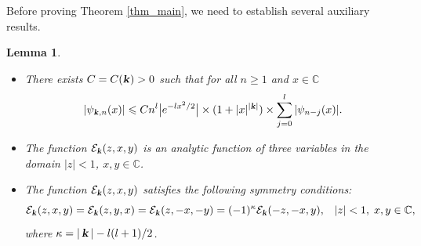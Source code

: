 \documentclass[12pt]{article}
\def\E{{\mathcal E}}
\def\c{{\mathbb C}}
\def\k{\textbf{\textsl{k}}}
\newtheorem{lemma}{Lemma}
\begin{document}
 
Before proving Theorem \ref{thm_main}, we need to establish several auxiliary results.  


\begin{lemma}\label{lemma1}
${}$
\begin{itemize}
\item[(i)]
There exists $C=C(\k)>0$ such that for all $n\geqslant 1$ and $x\in \c$
\begin{equation}\label{psi_upper_bound}
|\psi_{\k,n}(x)|\leqslant C n^l \big | e^{-l x^2/2}\big | \times (1+|x|^{|\k|}) \times \sum\limits_{j=0}^l 
|\psi_{n-j}(x)|.
\end{equation}
\item[(ii)]
 The function $\E_{\k}(z,x,y)$ 
is an analytic function of three variables in the domain $|z|<1$, $x,y\in \c$. 
\item[(iii)] The function $\E_{\k}(z,x,y)$  satisfies the following symmetry conditions:
\begin{equation}\label{E_k_symmetries}
\E_{\k}(z,x,y)=\E_{\k}(z,y,x)=\E_{\k}(z,-x,-y)=(-1)^{\kappa} \E_{\k}(-z,-x,y),  \;\;\; |z|<1, \; x,y\in \c, 
\end{equation}
where $\kappa=|\,\k\,|-l(l+1)/2$.
\end{itemize} 
\end{lemma}
\end{document}
